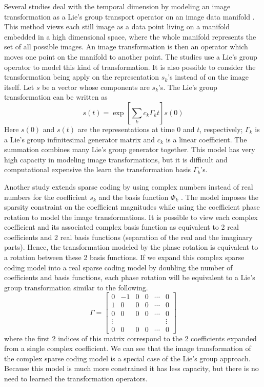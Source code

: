 Several studies deal with the temporal dimension by modeling an image transformation as a Lie's group transport operator on an image data manifold \cite{cb09, sj10}. This method views each still image as a data point living on a manifold embedded in a high dimensional space, where the whole manifold represents the set of all possible images. An image transformation is then an operator which moves one point on the manifold to another point. The studies use a Lie's group operator to model this kind of transformation. It is also possible to consider the transformation being apply on the representation $s_k$'s instead of on the image itself. Let $s$ be a vector whose components are $s_k$'s. The Lie's group transformation can be written as
\begin{equation}
s(t) = \exp\left[ \sum_k c_k \Gamma_k t \right] s(0)
\end{equation}
Here $s(0)$ and $s(t)$ are the representations at time $0$ and $t$, respectively; $\Gamma_k$ is a Lie's group infinitesimal generator matrix and $c_k$ is a linear coefficient. The summation combines many Lie's group generator together. This model has very high capacity in modeling image transformations, but it is difficult and computational expensive the learn the transformation basis $\Gamma_k$'s.

Another study extends sparse coding by using complex numbers instead of real numbers for the coefficient $s_k$ and the basis function $\Phi_k$ \cite{cc08}. The model imposes the sparsity constraint on the coefficient magnitudes while using the coefficient phase rotation to model the image transformations. It is possible to view each complex coefficient and its associated complex basis function as equivalent to 2 real coefficients and 2 real basis functions (separation of the real and the imaginary parts). Hence, the transformation modeled by the phase rotation is equivalent to a rotation between these 2 basis functions. If we expand this complex sparse coding model into a real sparse coding model by doubling the number of coefficients and basis functions, each phase rotation will be equivalent to a Lie's group transformation similar to the following.
\begin{equation}
\Gamma = 
\begin{bmatrix}
    0& -1& 0& 0& \cdots& 0\\
    1&  0& 0& 0& \cdots& 0\\
    0&  0& 0& 0& \cdots& 0\\
    \vdots&&&&&\vdots\\
    0&  0& 0& 0& \cdots& 0
\end{bmatrix}
\end{equation}
where the first 2 indices of this matrix correspond to the 2 coefficients expanded from a single complex coefficient. We can see that the image transformation of the complex sparse coding model is a special case of the Lie's group approach. Because this model is much more constrained it has less capacity, but there is no need to learned the transformation operators.

